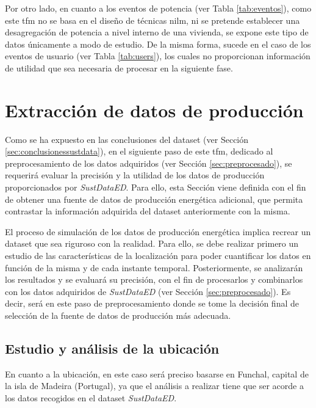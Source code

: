 \vspace{3mm}

Por otro lado, en cuanto a los eventos de potencia (ver Tabla \ref{tab:eventos}), como este \gls{tfm} no se basa en el diseño de técnicas \gls{nilm}, ni se pretende establecer una desagregación de potencia a nivel interno de una vivienda, se expone este tipo de datos únicamente a modo de estudio. De la misma forma, sucede en el caso de los eventos de usuario (ver Tabla \ref{tab:users}), los cuales no proporcionan información de utilidad que sea necesaria de procesar en la siguiente fase.

\section{Extracción de datos de producción}
\label{sec:global}

Como se ha expuesto en las conclusiones del dataset (ver Sección \ref{sec:conclusionessustdata}), en el siguiente paso de este \gls{tfm}, dedicado al preprocesamiento de los datos adquiridos (ver Sección \ref{sec:preprocesado}), se requerirá evaluar la precisión y la utilidad de los datos de producción proporcionados por \textit{SustDataED}. Para ello, esta Sección viene definida con el fin de obtener una fuente de datos de producción energética adicional, que permita contrastar la información adquirida del dataset anteriormente con la misma.

\vspace{3mm}

El proceso de simulación de los datos de producción energética implica recrear un dataset que sea riguroso con la realidad. Para ello, se debe realizar primero un estudio de las características de la localización para poder cuantificar los datos en función de la misma y de cada instante temporal. Posteriormente, se analizarán los resultados y se evaluará su precisión, con el fin de procesarlos y combinarlos con los datos adquiridos de \textit{SustDataED} (ver Sección \ref{sec:preprocesado}). Es decir, será en este paso de preprocesamiento donde se tome la decisión final de selección de la fuente de datos de producción más adecuada.

\subsection{Estudio y análisis de la ubicación}

En cuanto a la ubicación, en este caso será preciso basarse en Funchal, capital de la isla de Madeira (Portugal), ya que el análisis a realizar tiene que ser acorde a los datos recogidos en el dataset \textit{SustDataED}.

